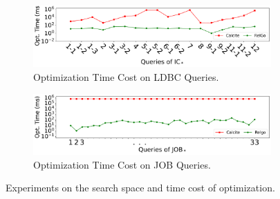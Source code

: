 \begin{figure}[ht]
\begin{subfigure}[b]{\linewidth}
    \end{subfigure}
    \begin{subfigure}[b]{\linewidth}
        \centering
        \includegraphics[width=\linewidth]{./figures/exp/optimization_sf30.pdf}
        \caption{Optimization Time Cost on LDBC Queries.}
        \label{fig:exp-optimization-sf30}
    \end{subfigure}
    \begin{subfigure}[b]{\linewidth}
        \centering
        \includegraphics[width=\linewidth]{./figures/exp/optimization_job.pdf}
        \caption{Optimization Time Cost on JOB Queries.}
        \label{fig:exp-optimization-job}
    \end{subfigure}
    \caption{Experiments on the search space and time cost of optimization.}
    \label{fig:exp-optimization}
\end{figure}







